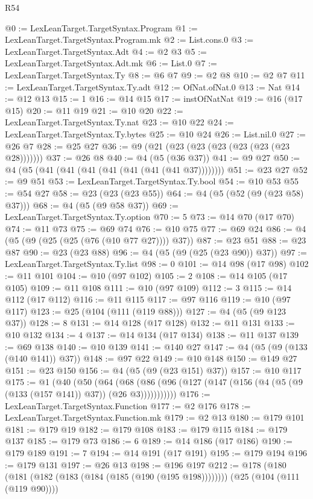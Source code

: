 \begin{lexlean}{R54}
\begin{coremodule}
@0 := LexLeanTarget.TargetSyntax.Program
@1 := LexLeanTarget.TargetSyntax.Program.mk
@2 := List.cons.{0}
@3 := LexLeanTarget.TargetSyntax.Adt
@4 := @2 @3
@5 := LexLeanTarget.TargetSyntax.Adt.mk
@6 := List.{0}
@7 := LexLeanTarget.TargetSyntax.Ty
@8 := @6 @7
@9 := @2 @8
@10 := @2 @7
@11 := LexLeanTarget.TargetSyntax.Ty.adt
@12 := OfNat.ofNat.{0}
@13 := Nat
@14 := @12 @13
@15 := 1
@16 := @14 @15
@17 := instOfNatNat
@19 := @16 (@17 @15)
@20 := @11 @19
@21 := @10 @20
@22 := LexLeanTarget.TargetSyntax.Ty.nat
@23 := @10 @22
@24 := LexLeanTarget.TargetSyntax.Ty.bytes
@25 := @10 @24
@26 := List.nil.{0}
@27 := @26 @7
@28 := @25 @27
@36 := @9 (@21 (@23 (@23 (@23 (@23 (@23 (@23 @28)))))))
@37 := @26 @8
@40 := @4 (@5 (@36 @37))
@41 := @9 @27
@50 := @4 (@5 (@41 (@41 (@41 (@41 (@41 (@41 (@41 @37))))))))
@51 := @23 @27
@52 := @9 @51
@53 := LexLeanTarget.TargetSyntax.Ty.bool
@54 := @10 @53
@55 := @54 @27
@58 := @23 (@23 (@23 @55))
@64 := @4 (@5 (@52 (@9 (@23 @58) @37)))
@68 := @4 (@5 (@9 @58 @37))
@69 := LexLeanTarget.TargetSyntax.Ty.option
@70 := 5
@73 := @14 @70 (@17 @70)
@74 := @11 @73
@75 := @69 @74
@76 := @10 @75
@77 := @69 @24
@86 := @4 (@5 (@9 (@25 (@25 (@76 (@10 @77 @27)))) @37))
@87 := @23 @51
@88 := @23 @87
@90 := @23 (@23 @88)
@96 := @4 (@5 (@9 (@25 (@23 @90)) @37))
@97 := LexLeanTarget.TargetSyntax.Ty.list
@98 := 0
@101 := @14 @98 (@17 @98)
@102 := @11 @101
@104 := @10 (@97 @102)
@105 := 2
@108 := @14 @105 (@17 @105)
@109 := @11 @108
@111 := @10 (@97 @109)
@112 := 3
@115 := @14 @112 (@17 @112)
@116 := @11 @115
@117 := @97 @116
@119 := @10 (@97 @117)
@123 := @25 (@104 (@111 (@119 @88)))
@127 := @4 (@5 (@9 @123 @37))
@128 := 8
@131 := @14 @128 (@17 @128)
@132 := @11 @131
@133 := @10 @132
@134 := 4
@137 := @14 @134 (@17 @134)
@138 := @11 @137
@139 := @69 @138
@140 := @10 @139
@141 := @140 @27
@147 := @4 (@5 (@9 (@133 (@140 @141)) @37))
@148 := @97 @22
@149 := @10 @148
@150 := @149 @27
@151 := @23 @150
@156 := @4 (@5 (@9 (@23 @151) @37))
@157 := @10 @117
@175 := @1
    (@40
      (@50
        (@64
          (@68 (@86 (@96 (@127 (@147 (@156 (@4 (@5 (@9 (@133 (@157 @141)) @37)) (@26 @3)))))))))))
@176 := LexLeanTarget.TargetSyntax.Function
@177 := @2 @176
@178 := LexLeanTarget.TargetSyntax.Function.mk
@179 := @2 @13
@180 := @179 @101
@181 := @179 @19
@182 := @179 @108
@183 := @179 @115
@184 := @179 @137
@185 := @179 @73
@186 := 6
@189 := @14 @186 (@17 @186)
@190 := @179 @189
@191 := 7
@194 := @14 @191 (@17 @191)
@195 := @179 @194
@196 := @179 @131
@197 := @26 @13
@198 := @196 @197
@212 := @178
    (@180 (@181 (@182 (@183 (@184 (@185 (@190 (@195 @198))))))))
    (@25 (@104 (@111 (@119 @90))))

\end{coremodule}
\end{lexlean}
